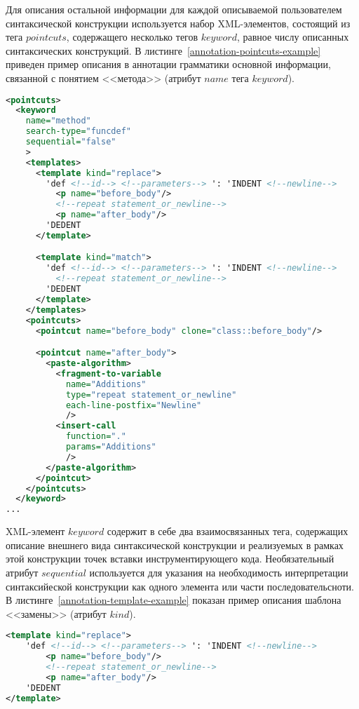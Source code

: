 Для описания остальной информации для каждой описываемой пользователем синтаксической конструкции используется набор XML-элементов, состоящий из тега $pointcuts$, содержащего несколько тегов $keyword$, равное числу описанных синтаксических конструкций.
В листинге~\ref{annotation-pointcuts-example} приведен пример описания в аннотации грамматики основной информации, связанной с понятием <<метода>> (атрибут $name$ тега $keyword$).

\begin{lstlisting}[frame=single, language=XML, label={annotation-pointcuts-example}, caption={Пример описания основной информации одной конструкции для языка Python.}]
<pointcuts>
  <keyword
    name="method"
    search-type="funcdef"
    sequential="false"
    >
    <templates>
      <template kind="replace">
        'def <!--id--> <!--parameters--> ': 'INDENT <!--newline-->
          <p name="before_body"/>
          <!--repeat statement_or_newline-->
          <p name="after_body"/>
        'DEDENT
      </template>

      <template kind="match">
        'def <!--id--> <!--parameters--> ': 'INDENT <!--newline-->
          <!--repeat statement_or_newline-->
        'DEDENT
      </template>
    </templates>
    <pointcuts>
      <pointcut name="before_body" clone="class::before_body"/>

      <pointcut name="after_body">
        <paste-algorithm>
          <fragment-to-variable
            name="Additions"
            type="repeat statement_or_newline"
            each-line-postfix="Newline"
            />
          <insert-call
            function="."
            params="Additions"
            />
        </paste-algorithm>
      </pointcut>
    </pointcuts>
  </keyword>
...
\end{lstlisting}

XML-элемент $keyword$ содержит в себе два взаимосвязанных тега, содержащих описание внешнего вида синтаксической конструкции и реализуемых в рамках этой конструкции точек вставки инструментирующего кода.
Необязательный атрибут $sequential$ используется для указания на необходимость интерпретации синтаксийеской конструкции как одного элемента или части последовательсноти.
В листинге~\ref{annotation-template-example} показан пример описания шаблона <<замены>> (атрибут $kind$).

\begin{lstlisting}[frame=single, language=XML, label={annotation-template-example}, caption={Пример описания шаблона.}]
<template kind="replace">
    'def <!--id--> <!--parameters--> ': 'INDENT <!--newline-->
        <p name="before_body"/>
        <!--repeat statement_or_newline-->
        <p name="after_body"/>
    'DEDENT
</template>
\end{lstlisting}

